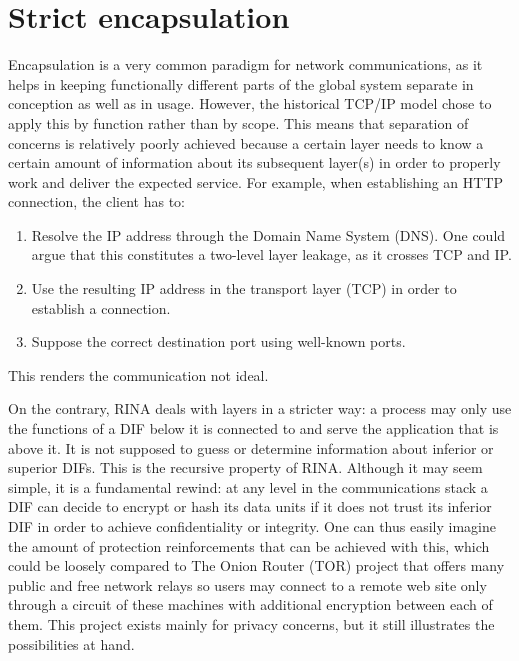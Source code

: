 \documentclass[a4paper]{proc}
\begin{document}
\section{Strict encapsulation}

\par Encapsulation is a very common paradigm for network communications, as it
helps in keeping functionally different parts of the global system separate in
conception as well as in usage. However, the historical TCP/IP model chose to
apply this by function rather than by scope. This means that separation of
concerns is relatively poorly achieved because a certain layer needs to know a
certain amount of information about its subsequent layer(s) in order to properly
work and deliver the expected service. For example, when establishing an HTTP
connection, the client has to:
\begin{enumerate}
    \item Resolve the IP address through the Domain Name System (DNS). One could
        argue that this constitutes a two-level layer leakage, as it crosses TCP
        and IP.
    \item Use the resulting IP address in the transport layer (TCP) in order to
        establish a connection.
    \item Suppose the correct destination port using well-known ports.
\end{enumerate}
This renders the communication not ideal.

\par On the contrary, RINA deals with layers in a stricter way: a process may
only use the functions of a DIF below it is connected to and serve the
application that is above it. It is not supposed to guess or determine
information about inferior or superior DIFs. This is the recursive property of
RINA. Although it may seem simple, it is a fundamental rewind: at any level in
the communications stack a DIF can decide to encrypt or hash its data units if
it does not trust its inferior DIF in order to achieve confidentiality or
integrity. One can thus easily imagine the amount of protection reinforcements
that can be achieved with this, which could be loosely compared to The Onion
Router (TOR) project that offers many public and free network relays so users
may connect to a remote web site only through a circuit of these machines with
additional encryption between each of them. This project exists mainly for
privacy concerns, but it still illustrates the possibilities at hand.
\end{document}
